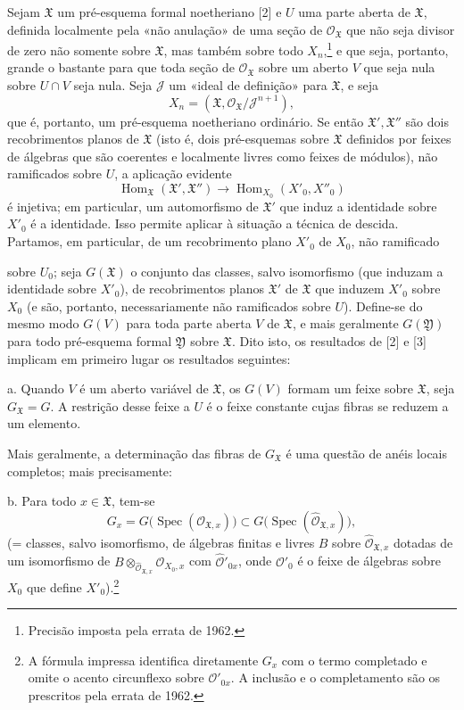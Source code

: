 Sejam $\mathfrak X$ um pré-esquema formal noetheriano [2] e $U$ uma parte
aberta de $\mathfrak X$, definida localmente pela «não anulação» de uma
seção de $\mathcal O_{\mathfrak X}$ que não seja divisor de zero não somente sobre
$\mathfrak X$, mas também sobre todo $X_n$,\footnote{Precisão imposta pela
errata de 1962.} e que seja, portanto, grande o bastante para que toda seção
de $\mathcal O_{\mathfrak X}$ sobre um aberto $V$ que seja nula sobre $U\cap V$
seja nula. Seja $\mathcal J$ um «ideal de definição» para $\mathfrak X$, e seja
\[
  X_n=(\mathfrak X,\mathcal O_{\mathfrak X}/\mathcal J^{n+1}),
\]
que é, portanto, um pré-esquema noetheriano ordinário. Se então
$\mathfrak X',\mathfrak X''$ são dois recobrimentos planos de $\mathfrak X$ (isto
é, dois pré-esquemas sobre $\mathfrak X$ definidos por feixes de álgebras que
são coerentes e localmente livres como feixes de módulos), não ramificados sobre
$U$, a aplicação evidente
\[
  \operatorname{Hom}_{\mathfrak X}(\mathfrak X',\mathfrak X'')
  \longrightarrow
  \operatorname{Hom}_{X_0}(X'_0,X''_0)
\]
é injetiva; em particular, um automorfismo de $\mathfrak X'$ que induz a
identidade sobre $X'_0$ é a identidade. Isso permite aplicar à situação a
técnica de descida. Partamos, em particular, de um recobrimento plano $X'_0$
de $X_0$, não ramificado

sobre $U_0$; seja $G(\mathfrak X)$ o conjunto das classes, salvo isomorfismo
(que induzam a identidade sobre $X'_0$), de recobrimentos planos $\mathfrak X'$
de $\mathfrak X$ que induzem $X'_0$ sobre $X_0$ (e são, portanto,
necessariamente não ramificados sobre $U$). Define-se do mesmo modo $G(V)$ para
toda parte aberta $V$ de $\mathfrak X$, e mais geralmente $G(\mathfrak Y)$
para todo pré-esquema formal $\mathfrak Y$ sobre $\mathfrak X$. Dito isto, os
resultados de [2] e [3] implicam em primeiro lugar os resultados seguintes:

\noindent a. Quando $V$ é um aberto variável de $\mathfrak X$, os $G(V)$
formam um feixe sobre $\mathfrak X$, seja $G_{\mathfrak X}=G$. A restrição desse
feixe a $U$ é o feixe constante cujas fibras se reduzem a um elemento.

Mais geralmente, a determinação das fibras de $G_{\mathfrak X}$ é uma
questão de anéis locais completos; mais precisamente:

\noindent b. Para todo $x\in\mathfrak X$, tem-se
\[
  G_x=G\bigl(\operatorname{Spec}(\mathcal O_{\mathfrak X,x})\bigr)
  \subset
  G\bigl(\operatorname{Spec}(\widehat{\mathcal O}_{\mathfrak X,x})\bigr),
\]
(= classes, salvo isomorfismo, de álgebras finitas e livres $B$ sobre
$\widehat{\mathcal O}_{\mathfrak X,x}$ dotadas de um isomorfismo de
$B\otimes_{\widehat{\mathcal O}_{\mathfrak X,x}}\mathcal O_{X_0,x}$ com
$\widehat{\mathcal O}'_{0x}$, onde $\mathcal O'_0$ é o feixe de álgebras sobre
$X_0$ que define $X'_0$).\footnote{A fórmula impressa identifica diretamente
$G_x$ com o termo completado e omite o acento circunflexo sobre
$\mathcal O'_{0x}$. A inclusão e o completamento são os prescritos pela
errata de 1962.}

